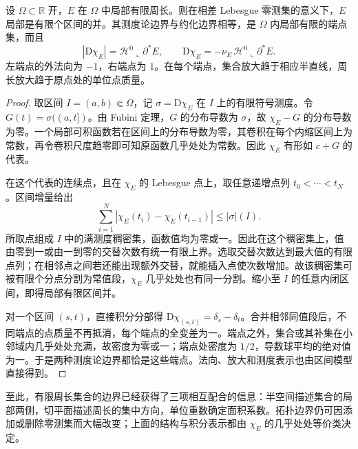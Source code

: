 \begin{proposition}\label{g3:prop:one-dimensional-perimeter-structure}
	设 \(\Omega\subset\mathbb R\) 开，\(E\) 在 \(\Omega\) 中局部有限周长。则在相差 Lebesgue 零测集的意义下，\(E\) 局部是有限个区间的并。其测度论边界与约化边界相等，是 \(\Omega\) 内局部有限的端点集，而且
	\[
		|\mathrm D\chi_E|=\mathcal H^0\llcorner\partial^*E,\qquad
		\mathrm D\chi_E=-\nu_E\,\mathcal H^0\llcorner\partial^*E.
	\]
	左端点的外法向为 \(-1\)，右端点为 \(1\)。在每个端点，集合放大趋于相应半直线，周长放大趋于原点处的单位点质量。
\end{proposition}
\begin{proof}
	取区间 \(I=(a,b)\Subset\Omega\)，记 \(\sigma=\mathrm D\chi_E\) 在 \(I\) 上的有限符号测度。令 \(G(t)=\sigma((a,t])\)。由 Fubini 定理，\(G\) 的分布导数为 \(\sigma\)，故 \(\chi_E-G\) 的分布导数为零。一个局部可积函数若在区间上的分布导数为零，其卷积在每个内缩区间上为常数，再令卷积尺度趋零即可知原函数几乎处处为常数。因此 \(\chi_E\) 有形如 \(c+G\) 的代表。

	在这个代表的连续点，且在 \(\chi_E\) 的 Lebesgue 点上，取任意递增点列 \(t_0<\cdots<t_N\)。区间增量给出
	\[
		\sum_{i=1}^N|\chi_E(t_i)-\chi_E(t_{i-1})|
		\le|\sigma|(I).
	\]
	所取点组成 \(I\) 中的满测度稠密集，函数值均为零或一。因此在这个稠密集上，值由零到一或由一到零的交替次数有统一有限上界。选取交替次数达到最大值的有限点列；在相邻点之间若还能出现额外交替，就能插入点使次数增加。故该稠密集可被有限个分点分割为常值段，\(\chi_E\) 几乎处处也有同一分割。缩小至 \(I\) 的任意内闭区间，即得局部有限区间并。

	对一个区间 \((s,t)\)，直接积分分部得
	\(\mathrm D\chi_{(s,t)}=\delta_s-\delta_t\)。合并相邻同值段后，不同端点的点质量不再抵消，每个端点的全变差为一。端点之外，集合或其补集在小邻域内几乎处处充满，故密度为零或一；端点处密度为 \(1/2\)，导数球平均的绝对值为一。于是两种测度论边界都恰是这些端点。法向、放大和测度表示也由区间模型直接得到。
\end{proof}

至此，有限周长集合的边界已经获得了三项相互配合的信息：半空间描述集合的局部两侧，切平面描述周长的集中方向，单位重数确定面积系数。拓扑边界仍可因添加或删除零测集而大幅改变；上面的结构与积分表示都由 \(\chi_E\) 的几乎处处等价类决定。
